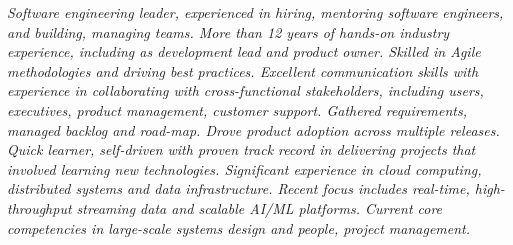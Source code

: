 {\selectfont
	\begin{justify}\textit{Software engineering leader, experienced in hiring, mentoring software engineers, and building, managing teams. More than 12 years of hands-on industry experience, including as development lead and product owner. Skilled in Agile methodologies and driving best practices. Excellent communication skills with experience in collaborating with cross-functional stakeholders, including users, executives, product management, customer support. Gathered requirements, managed backlog and road-map. Drove product adoption across multiple releases. Quick learner, self-driven with proven track record in delivering projects that involved learning new technologies. Significant experience in cloud computing, distributed systems and data infrastructure. Recent focus includes real-time, high-throughput streaming data and scalable AI/ML platforms. Current core competencies in large-scale systems design and people, project management.}\end{justify}
}